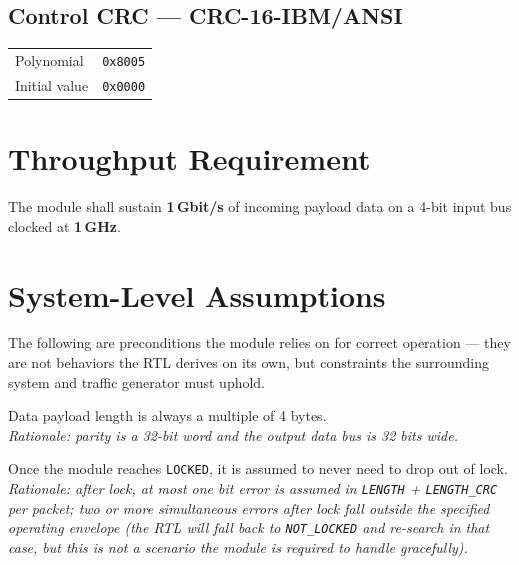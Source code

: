 \documentclass[11pt,a4paper]{article}
\begin{document}
\subsection{Control CRC --- CRC-16-IBM/ANSI}
\begin{center}
\begin{tabular}{ll}
\toprule
Polynomial & \texttt{0x8005} \\
Initial value & \texttt{0x0000} \\
\bottomrule
\end{tabular}
\end{center}

\section{Throughput Requirement}
The module shall sustain \textbf{1\,Gbit/s} of incoming payload data on a
4-bit input bus clocked at \textbf{1\,GHz}.

\section{System-Level Assumptions}
The following are preconditions the module relies on for correct operation
--- they are not behaviors the RTL derives on its own, but constraints the
surrounding system and traffic generator must uphold.

\begin{sysBox}
Data payload length is always a multiple of 4 bytes.\\
\textit{Rationale: parity is a 32-bit word and the output data bus is 32 bits wide.}
\end{sysBox}

\begin{sysBox}
Once the module reaches \texttt{LOCKED}, it is assumed to never need to drop
out of lock.\\
\textit{Rationale: after lock, at most one bit error is assumed in
\texttt{LENGTH} + \texttt{LENGTH\_CRC} per packet; two or more simultaneous
errors after lock fall outside the specified operating envelope (the RTL
will fall back to \texttt{NOT\_LOCKED} and re-search in that case, but this
is not a scenario the module is required to handle gracefully).}
\end{sysBox}
\end{document}
